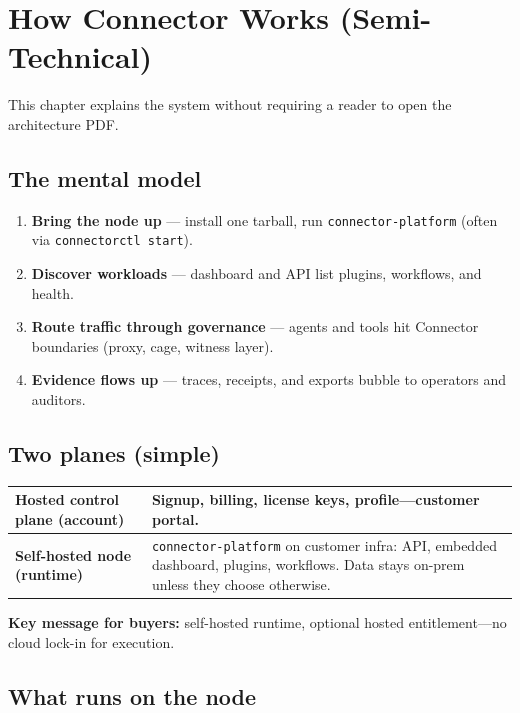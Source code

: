\chapter{How Connector Works (Semi-Technical)}

This chapter explains the system without requiring a reader to open the architecture PDF.

\section{The mental model}

\begin{enumerate}
  \item \textbf{Bring the node up} --- install one tarball, run \texttt{connector-platform} (often via \texttt{connectorctl start}).
  \item \textbf{Discover workloads} --- dashboard and API list plugins, workflows, and health.
  \item \textbf{Route traffic through governance} --- agents and tools hit Connector boundaries (proxy, cage, witness layer).
  \item \textbf{Evidence flows up} --- traces, receipts, and exports bubble to operators and auditors.
\end{enumerate}

\section{Two planes (simple)}

\begin{center}
\renewcommand{\arraystretch}{1.35}
\begin{tabularx}{0.92\textwidth}{@{}lX@{}}
\toprule
\textbf{Hosted control plane (account)} & Signup, billing, license keys, profile---customer portal. \\
\midrule
\textbf{Self-hosted node (runtime)} & \texttt{connector-platform} on customer infra: API, embedded dashboard, plugins, workflows. Data stays on-prem unless they choose otherwise. \\
\bottomrule
\end{tabularx}
\end{center}

\noindent\textbf{Key message for buyers:} self-hosted runtime, optional hosted entitlement---no cloud lock-in for execution.

\section{What runs on the node}

